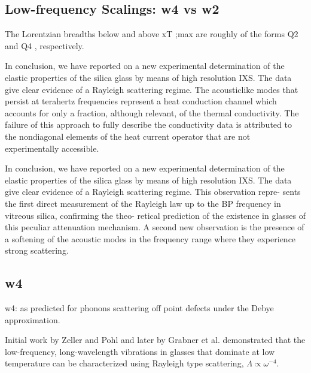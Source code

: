 \documentclass[aps,prb,twocolumn,superscriptaddress,footinbib,amsmath,amssymb,floatfix]{revtex4}
\begin{document}
\subsection{\label{S:Theory:Thermal}Low-frequency Scalings: w4 vs w2}

The Lorentzian breadths below and above xT ;max are roughly of the 
forms Q2 and Q4 , respectively.\cite{feldman_calculations_2002}


In conclusion, we have reported on a new experimental
determination of the elastic properties of the silica glass by
means of high resolution IXS. The data give clear evidence
of a Rayleigh scattering regime.\cite{baldi_thermal_2008} 
The acousticlike modes that persist at
terahertz frequencies represent a heat conduction channel which accounts 
for only a fraction, although relevant,
of the thermal conductivity. The failure of this approach to fully 
describe the conductivity data is attributed to
the nondiagonal elements of the heat current operator that are not 
experimentally accessible.\cite{baldi_thermal_2008}

In conclusion, we have reported on a new experimental
determination of the elastic properties of the silica glass by
means of high resolution IXS. The data give clear evidence
of a Rayleigh scattering regime. This observation repre-
sents the first direct measurement of the Rayleigh law up to
the BP frequency in vitreous silica, confirming the theo-
retical prediction of the existence in glasses of this peculiar
attenuation mechanism. A second new observation is the
presence of a softening of the acoustic modes in the
frequency range where they experience strong scattering.
\cite{baldi_sound_2010} 

\subsection{\label{S:Theory:Thermal}w4}

w4: as predicted for phonons scattering off point defects under 
the Debye approximation.

Initial work by Zeller and Pohl\cite{zeller_thermal_1971} 
and later by Grabner et al.\cite{graebner_phonon_1986}  
demonstrated that the low-frequency, long-wavelength 
vibrations in glasses that dominate at low temperature can 
be characterized using Rayleigh 
type scattering, $\Lambda \propto \omega^{-4}$. 
\end{document}
